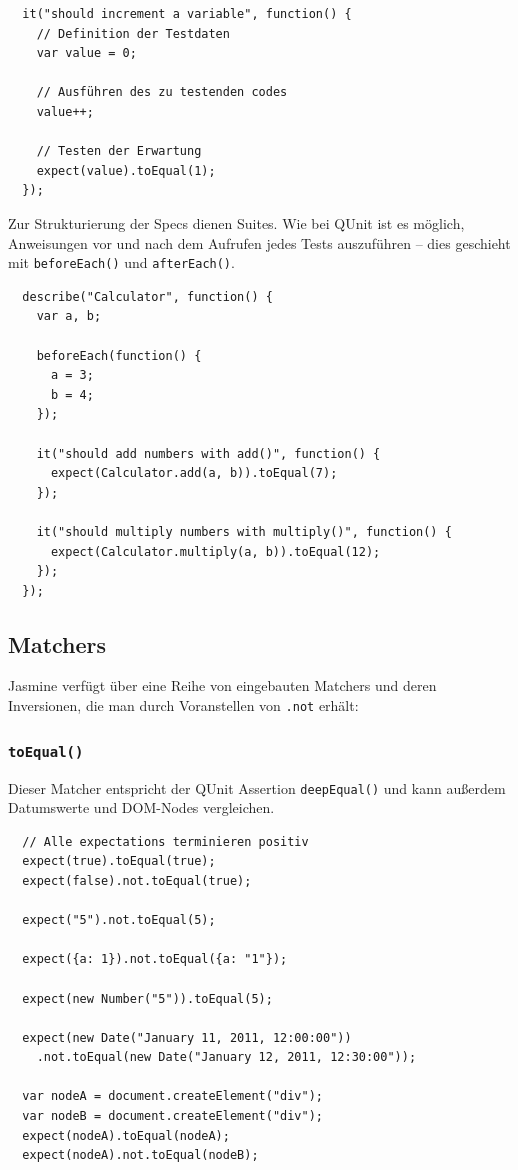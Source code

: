 \documentclass[11pt, a4paper]{article}
\begin{document}
\begin{verbatim}
  it("should increment a variable", function() {
    // Definition der Testdaten
    var value = 0;

    // Ausführen des zu testenden codes
    value++;

    // Testen der Erwartung
    expect(value).toEqual(1);
  });
\end{verbatim}

Zur Strukturierung der Specs dienen Suites. Wie bei QUnit ist es möglich,
Anweisungen vor und nach dem Aufrufen jedes Tests auszuführen -- dies geschieht
mit \texttt{beforeEach()} und \texttt{afterEach()}.

\begin{verbatim}
  describe("Calculator", function() {
    var a, b;

    beforeEach(function() {
      a = 3;
      b = 4;
    });

    it("should add numbers with add()", function() {
      expect(Calculator.add(a, b)).toEqual(7);
    });

    it("should multiply numbers with multiply()", function() {
      expect(Calculator.multiply(a, b)).toEqual(12);
    });
  });
\end{verbatim}

\subsection{Matchers}

Jasmine verfügt über eine Reihe von eingebauten Matchers und deren Inversionen,
die man durch Voranstellen von \texttt{.not} erhält:

\subsubsection*{\texttt{toEqual()}}

Dieser Matcher entspricht der QUnit Assertion \texttt{deepEqual()} und
kann außerdem Datumswerte und DOM-Nodes vergleichen.

\begin{verbatim}
  // Alle expectations terminieren positiv
  expect(true).toEqual(true);
  expect(false).not.toEqual(true);

  expect("5").not.toEqual(5);

  expect({a: 1}).not.toEqual({a: "1"});

  expect(new Number("5")).toEqual(5);

  expect(new Date("January 11, 2011, 12:00:00"))
    .not.toEqual(new Date("January 12, 2011, 12:30:00"));

  var nodeA = document.createElement("div");
  var nodeB = document.createElement("div");
  expect(nodeA).toEqual(nodeA);
  expect(nodeA).not.toEqual(nodeB);
\end{verbatim}
\end{document}
